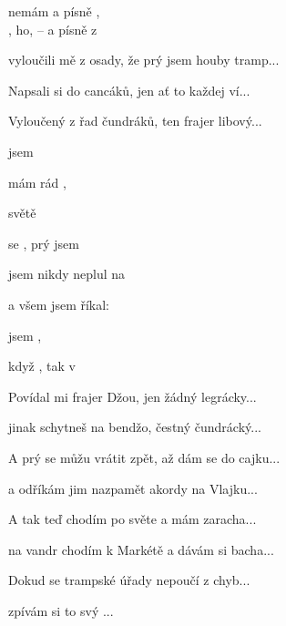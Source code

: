 

\zs
{} nemám  a  písně ,
\\
, ho,  -- a  písně z  

vyloučili mě z osady, že prý jsem houby tramp...

Napsali si do cancáků, jen ať to každej ví...

Vyloučený z řad čundráků, ten frajer libový...
\ks

\zr
{} jsem  

 mám rád ,

 

  světě 

 se ,  prý jsem  

 jsem nikdy neplul na 

a všem  jsem říkal: 

 jsem  ,

 když , tak v   
\kr

\zs
Povídal mi frajer Džou, jen žádný legrácky...

jinak schytneš na bendžo, čestný čundrácký...

A prý se můžu vrátit zpět, až dám se do cajku...

a odříkám jim nazpamět akordy na Vlajku...
\ks

\zr \kr

\zs
A tak teď chodím po světe a mám zaracha...

na vandr chodím k Markétě a dávám si bacha...

Dokud se trampské úřady nepoučí z chyb...

zpívám si to svý ...
\ks

\zr \kr

\kp





